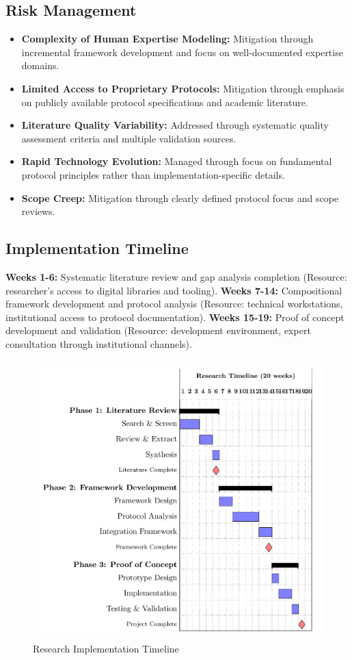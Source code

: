 \documentclass[12pt,a4paper]{article}
\begin{document}
\subsection{Risk Management}
\begin{itemize}
\item \textbf{Complexity of Human Expertise Modeling:} Mitigation through incremental framework development and focus on well-documented expertise domains.
\item \textbf{Limited Access to Proprietary Protocols:} Mitigation through emphasis on publicly available protocol specifications and academic literature.
\item \textbf{Literature Quality Variability:} Addressed through systematic quality assessment criteria and multiple validation sources.
\item \textbf{Rapid Technology Evolution:} Managed through focus on fundamental protocol principles rather than implementation-specific details.
\item \textbf{Scope Creep:} Mitigation through clearly defined protocol focus and scope reviews.
\end{itemize}

\subsection{Implementation Timeline}

\textbf{Weeks 1-6:} Systematic literature review and gap analysis completion (Resource: researcher's access to digital libraries and tooling).
\textbf{Weeks 7-14:} Compositional framework development and protocol analysis (Resource: technical workstations, institutional access to protocol documentation).
\textbf{Weeks 15-19:} Proof of concept development and validation (Resource: development environment, expert consultation through institutional channels).

\begin{figure}[h!]
    \centering
    \includegraphics[width=.8\linewidth]{timeline-gantt-simple-1.png}
    \caption{Research Implementation Timeline}
    \label{fig:timeline}
\end{figure}
\end{document}
